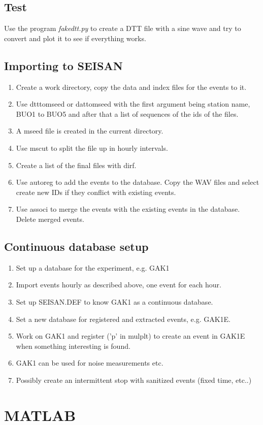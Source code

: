 \documentclass[a4paper]{article}
\begin{document}
\begin{multicols}{2}
    \subsection{Test}
    Use the program \textit{fakedtt.py} to create a DTT file with a sine
    wave and try to convert and plot it to see if everything works.

    \subsection{Importing to SEISAN}
      \begin{enumerate}
        \item Create a work directory, copy the data and index files for
          the events to it.
        \item Use dtttomseed or dattomseed with the first argument being
          station name, BUO1 to BUO5 and after that a list of sequences
          of the ids of the files.
        \item A mseed file is created in the current directory.
        \item Use mscut to split the file up in hourly intervals.
        \item Create a list of the final files with dirf.
        \item Use autoreg to add the events to the database. Copy the
          WAV files and select create new IDs if they conflict with
          existing events.
        \item Use associ to merge the events with the existing events in
          the database. Delete merged events.
      \end{enumerate}

      \subsection{Continuous database setup}
      \begin{enumerate}
        \item Set up a database for the experiment, e.g. GAK1
        \item Import events hourly as described above, one event for
          each hour.
        \item Set up SEISAN.DEF to know GAK1 as a continuous database.
        \item Set a new database for registered and extracted events, e.g. GAK1E.
        \item Work on GAK1 and register ('p' in mulplt) to create an
          event in GAK1E when something interesting is found.
        \item GAK1 can be used for noise measurements etc.
        \item Possibly create an intermittent stop with sanitized events
          (fixed time, etc..)
      \end{enumerate}
  \section{MATLAB}


\end{multicols}
\end{document}
